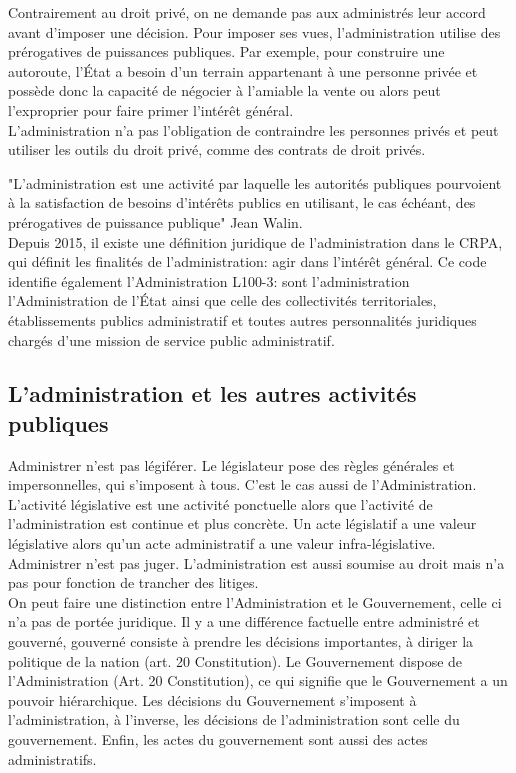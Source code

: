 \documentclass[10pt, a4paper, openany]{book}
\begin{document}
Contrairement au droit privé, on ne demande pas aux administrés leur accord avant d'imposer une décision. Pour imposer ses vues, l'administration utilise des prérogatives de puissances publiques. Par exemple, pour construire une autoroute, l'État a besoin d'un terrain appartenant à une personne privée et possède donc la capacité de négocier à l'amiable la vente ou alors peut l'exproprier pour faire primer l'intérêt général. \\
L'administration n'a pas l'obligation de contraindre les personnes privés et peut utiliser les outils du droit privé, comme des contrats de droit privés. 


"L'administration est une activité par laquelle les autorités publiques pourvoient à la satisfaction de besoins d'intérêts publics en utilisant, le cas échéant, des prérogatives de puissance publique" Jean Walin. \\
Depuis 2015, il existe une définition juridique de l'administration dans le CRPA, qui définit les finalités de l'administration: agir dans l'intérêt général. Ce code identifie également l'Administration L100-3: sont l'administration l'Administration de l'État ainsi que celle des collectivités territoriales, établissements publics administratif et toutes autres personnalités juridiques chargés d'une mission de service public administratif.

\subsection{L'administration et les autres activités publiques}

Administrer n'est pas légiférer. Le législateur pose des règles générales et impersonnelles, qui s'imposent à tous. C'est le cas aussi de l'Administration. L'activité législative est une activité ponctuelle alors que l'activité de l'administration est continue et plus concrète. Un acte législatif a une valeur législative alors qu'un acte administratif a une valeur infra-législative. \\
Administrer n'est pas juger. L'administration est aussi soumise au droit mais n'a pas pour fonction de trancher des litiges. \\
On peut faire une distinction entre l'Administration et le Gouvernement, celle ci n'a pas de portée juridique. Il y a une différence factuelle entre administré et gouverné, gouverné consiste à prendre les décisions importantes, à diriger la politique de la nation (art. 20 Constitution). Le Gouvernement dispose de l'Administration (Art. 20 Constitution), ce qui signifie que le Gouvernement a un pouvoir hiérarchique. Les décisions du Gouvernement s'imposent à l'administration, à l'inverse, les décisions de l'administration sont celle du gouvernement. Enfin, les actes du gouvernement sont aussi des actes administratifs. 
\end{document}
